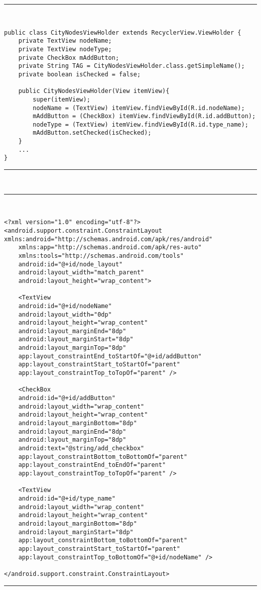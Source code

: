 \noindent\rule[-1ex]{\textwidth}{1pt}\\
\begin{lstlisting}[caption=Código para crear un elemento de una lista en Android.]
public class CityNodesViewHolder extends RecyclerView.ViewHolder {
	private TextView nodeName;
	private TextView nodeType;
	private CheckBox mAddButton;
	private String TAG = CityNodesViewHolder.class.getSimpleName();
	private boolean isChecked = false;
	
	public CityNodesViewHolder(View itemView){
		super(itemView);
		nodeName = (TextView) itemView.findViewById(R.id.nodeName);
		mAddButton = (CheckBox) itemView.findViewById(R.id.addButton);
		nodeType = (TextView) itemView.findViewById(R.id.type_name);
		mAddButton.setChecked(isChecked);
	}
	...
}
\end{lstlisting}
\noindent\rule[-1ex]{\textwidth}{1pt}\\
\newpage
\noindent\rule[-1ex]{\textwidth}{1pt}\\
\begin{lstlisting}[caption=Código XML de la vista de un elemento de la lista.]
<?xml version="1.0" encoding="utf-8"?>
<android.support.constraint.ConstraintLayout xmlns:android="http://schemas.android.com/apk/res/android"
	xmlns:app="http://schemas.android.com/apk/res-auto"
	xmlns:tools="http://schemas.android.com/tools"
	android:id="@+id/node_layout"
	android:layout_width="match_parent"
	android:layout_height="wrap_content">

	<TextView
	android:id="@+id/nodeName"
	android:layout_width="0dp"
	android:layout_height="wrap_content"
	android:layout_marginEnd="8dp"
	android:layout_marginStart="8dp"
	android:layout_marginTop="8dp"
	app:layout_constraintEnd_toStartOf="@+id/addButton"
	app:layout_constraintStart_toStartOf="parent"
	app:layout_constraintTop_toTopOf="parent" />
	
	<CheckBox
	android:id="@+id/addButton"
	android:layout_width="wrap_content"
	android:layout_height="wrap_content"
	android:layout_marginBottom="8dp"
	android:layout_marginEnd="8dp"
	android:layout_marginTop="8dp"
	android:text="@string/add_checkbox"
	app:layout_constraintBottom_toBottomOf="parent"
	app:layout_constraintEnd_toEndOf="parent"
	app:layout_constraintTop_toTopOf="parent" />
	
	<TextView
	android:id="@+id/type_name"
	android:layout_width="wrap_content"
	android:layout_height="wrap_content"
	android:layout_marginBottom="8dp"
	android:layout_marginStart="8dp"
	app:layout_constraintBottom_toBottomOf="parent"
	app:layout_constraintStart_toStartOf="parent"
	app:layout_constraintTop_toBottomOf="@+id/nodeName" />

</android.support.constraint.ConstraintLayout>
\end{lstlisting}
\noindent\rule[-1ex]{\textwidth}{1pt}\\
